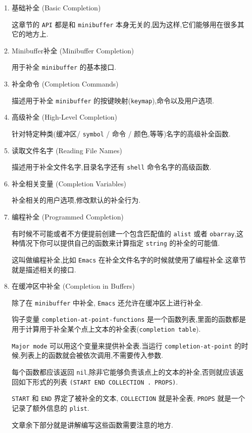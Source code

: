 \documentclass[11pt]{article}
\begin{document}
\begin{enumerate}
\item 基础补全 (Basic Completion)
\label{sec:org5ecb9c6}

这章节的 \texttt{API} 都是和 \texttt{minibuffer} 本身无关的,因为这样,它们能够用在很多其它的地方上.




\item Minibuffer补全 (Minibuffer Completion)
\label{sec:org2399df1}

用于补全 \texttt{minibuffer} 的基本接口.


\item 补全命令 (Completion Commands)
\label{sec:org2ad5cec}

描述用于补全 \texttt{minibuffer} 的按键映射(\texttt{keymap}),命令以及用户选项.


\item 高级补全 (High-Level Completion)
\label{sec:orgbd88adf}

针对特定种类(缓冲区/ \texttt{symbol} / 命令 / 颜色,等等)名字的高级补全函数.


\item 读取文件名字 (Reading File Names)
\label{sec:org2e8de50}

描述用于补全文件名字,目录名字还有 \texttt{shell} 命令名字的高级函数.


\item 补全相关变量 (Completion Variables)
\label{sec:orgce8bb1a}

补全相关的用户选项,修改默认的补全行为.


\item 编程补全 (Programmed Completion)
\label{sec:orgea95e9e}

有时候不可能或者不方便提前创建一个包含匹配值的 \texttt{alist} 或者 \texttt{obarray},这种情况下你可以提供自己的函数来计算指定 \texttt{string} 的补全的可能值.

这叫做编程补全,比如 \texttt{Emacs} 在补全文件名字的时候就使用了编程补全.这章节就是描述相关的接口.


\item 在缓冲区中补全 (Completion in Buffers)
\label{sec:orgfc1a92c}

除了在 \texttt{minibuffer} 中补全, \texttt{Emacs} 还允许在缓冲区上进行补全.

钩子变量 \texttt{completion-at-point-functions} 是一个函数列表,里面的函数都是用于计算用于补全某个点上文本的补全表(\texttt{completion table}).

\texttt{Major mode} 可以用这个变量来提供补全表.当运行 \texttt{completion-at-point} 的时候,列表上的函数就会被依次调用,不需要传入参数.

每个函数都应该返回 \texttt{nil},除非它能够负责该点上的文本的补全,否则就应该返回如下形式的列表 \texttt{(START END COLLECTION . PROPS)}.

\texttt{START} 和 \texttt{END} 界定了被补全的文本, \texttt{COLLECTION} 就是补全表, \texttt{PROPS} 就是一个记录了额外信息的 \texttt{plist}.

文章余下部分就是讲解编写这些函数需要注意的地方.
\end{enumerate}
\end{document}

